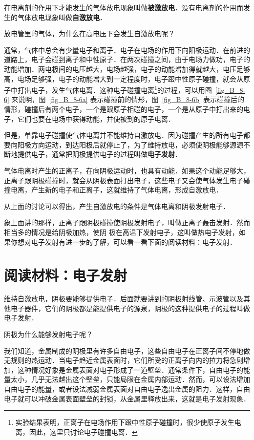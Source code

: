 在电离剂的作用下才能发生的气体放电现象叫做\textbf{被激放电}．没有电离剂的作用而发生的气体放电现象叫做\textbf{自激放电}．

放电管里的气体，为什么在高电压下会发生自激放电呢？

通常，气体中总会有少量电子和离子．电子在电场的作用下向阳极运动．在前进的道路上，电子会碰到离子和中性原子．在两次碰撞之间，由于电场力做功，电子的动能增加．两电极间的电压越大，电场越强，电子的动能增加得就越大，电压足够高，电场足够强，电子的动能增大到一定程度时，电子跟中性原子碰撞，就会从原子中打出电子，发生气体电离．这种电子碰撞电离\footnote{实验结果表明，正离子在电场作用下跟中性原子碰撞时，很少使原子发生电离，因此，这里只讨论电子碰撞电离．}的过程，可以用图~\ref{fig_B_8-6} 来说明，图~\ref{fig_B_8-6a} 表示碰撞前的情形，图~\ref{fig_B_8-6b} 表示碰撞后的情形，碰撞后有两个电子，一个是跟原子相碰的电子，一个是从原子中打出来的电子，它们也要在电场中获得动能，并使被到的原子电离．

但是，单靠电子碰撞使气体电离并不能维持自激放电．因为碰撞产生的所有电子都要向阳极方向运动，到达阳极后就停止了，为了维持放电，必须使阴极能够源源不断地提供电子，通常把阴极提供电子的过程叫做\textbf{电子发射}．

气体电离时产生的正离子，在向阴极运动时，也具有动能．如果这个动能足够大，正离子跟阴极碰撞时，就会从阴极表面打出电子，这些电子又会使气体发生电子碰撞电离，产生新的电子和正离子，这就维持了气体电离，形成自激放电．

从上面的讨论可以得出，产生自激放电的条件是气体电离和阴极发射电子．

象上面讲的那样，正离子跟阴极碰撞使阴极发射电子，叫做正离子轰击发射．然而相当多的情况是给阴极加热，使阴
极在高温下发射电子，这叫做热电子发射，如果你想对电子发射有进一步的了解，可以看一看下面的阅读材料：电子发射．


\section*{阅读材料：电子发射}
维持自激放电，阴极要能够提供电子．后面就要讲到的阴极射线管、示波管以及其他电子器件，它们的阴极都是能提供电子的源泉，阴极的这种提供电子的过程叫做电子发射．

阴极为什么能够发射电子呢？

我们知道，金属制成的阴极里有许多自由电子，这些自由电子在正离子间不停地做无规则的热运动．当电子趋近金属表面时，它们所受的正离子向内的拉力将急剧增加，这种情况好象是金属表面对电子形成了一道壁垒．通常条件下，自由电子的能量太小，几乎无法越出这个壁垒，只能局限在金属内部运动．然而，可以设法增加自由电子的能量，或者设法减弱金属表面对自由电子逸出金属的阻力．这样，自由电子就可以冲破金属表面壁垒的封锁，从金属里释放出来，这就是电子发射现象．

